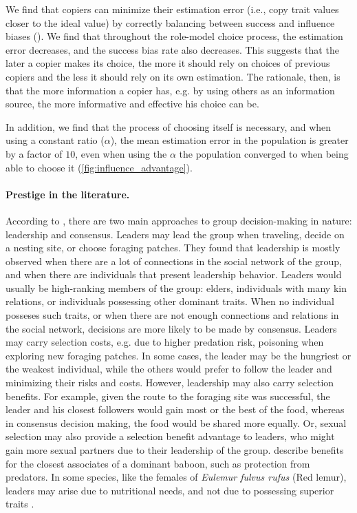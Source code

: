 \documentclass[12pt]{extarticle}
\begin{document}
We find that copiers can minimize their estimation error (i.e., copy trait values closer to the ideal value) by correctly balancing between success and influence biases ().
We find that throughout the role-model choice process, the estimation error decreases, and the success bias rate also decreases. This suggests that the later a copier makes its choice, the more it should rely on choices of previous copiers and the less it should rely on its own estimation.
The rationale, then, is that the more information a copier has, e.g. by using others as an information source, the more informative and effective his choice can be.

In addition, we find that the process of choosing itself is necessary, and when using a constant ratio ($\alpha$), the mean estimation error in the population is greater by a factor of $10$, even when using the $\alpha$ the population converged to when being able to choose it (\cref{fig:influence_advantage}).

\paragraph{Prestige in the literature.}

According to \citet{animal_leadership}, there are two main approaches to group decision-making in nature: leadership and consensus.
Leaders may lead the group when traveling, decide on a nesting site, or choose foraging patches. They found that leadership is mostly observed when there are a lot of connections in the social network of the group, and when there are individuals that present leadership behavior.
Leaders would usually be high-ranking members of the group: elders, individuals with many kin relations, or individuals possessing other dominant traits.
When no individual posseses such traits, or when there are not enough connections and relations in the social network, decisions are more likely to be made by consensus.
Leaders may carry selection costs, e.g. due to higher predation risk, poisoning when exploring new foraging patches.
In some cases, the leader may be the hungriest or the weakest individual, while the others would prefer to follow the leader and minimizing their risks and costs.
However, leadership may also carry selection benefits. For example, given the route to the foraging site was successful, the leader and his closest followers would gain most or the best of the food, whereas in consensus decision making, the food would be shared more equally. Or, sexual selection may also provide a selection benefit advantage to leaders, who might gain more sexual partners due to their leadership of the group. \citet{animal_leadership} describe benefits for the closest associates of a dominant baboon, such as protection from predators. 
In some species, like the females of \textit{Eulemur fulvus rufus} (Red lemur), leaders may arise due to nutritional needs, and not due to possessing superior traits \citep{lemurs}.
\end{document}
